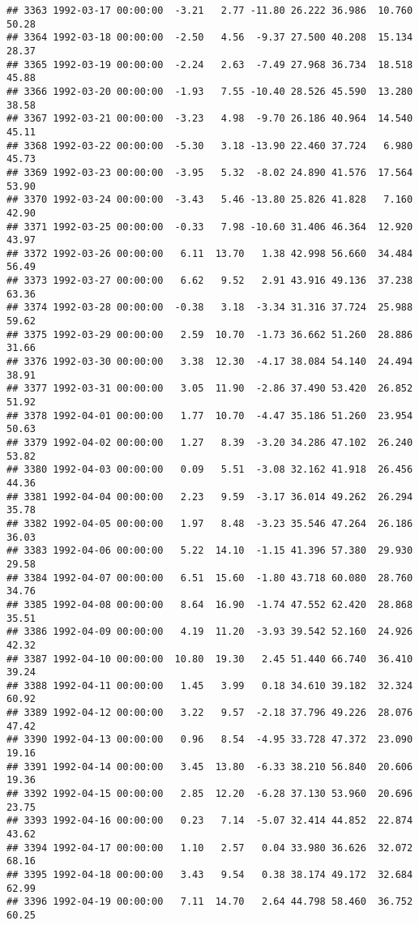 \documentclass{article}\usepackage{graphicx, color}
\makeatletter
\newenvironment{kframe}{%
 \def\at@end@of@kframe{}%
 \ifinner\ifhmode%
  \def\at@end@of@kframe{\end{minipage}}%
  \begin{minipage}{\columnwidth}%
 \fi\fi%
 \def\FrameCommand##1{\hskip\@totalleftmargin \hskip-\fboxsep
 \colorbox{shadecolor}{##1}\hskip-\fboxsep
     \hskip-\linewidth \hskip-\@totalleftmargin \hskip\columnwidth}%
 \MakeFramed {\advance\hsize-\width
   \@totalleftmargin\z@ \linewidth\hsize
   \@setminipage}}%
 {\par\unskip\endMakeFramed%
 \at@end@of@kframe}
\newenvironment{knitrout}{}{} %
\makeatother
\begin{document}
\begin{knitrout}
\begin{kframe}
\begin{verbatim}
## 3363 1992-03-17 00:00:00  -3.21   2.77 -11.80 26.222 36.986  10.760  50.28
## 3364 1992-03-18 00:00:00  -2.50   4.56  -9.37 27.500 40.208  15.134  28.37
## 3365 1992-03-19 00:00:00  -2.24   2.63  -7.49 27.968 36.734  18.518  45.88
## 3366 1992-03-20 00:00:00  -1.93   7.55 -10.40 28.526 45.590  13.280  38.58
## 3367 1992-03-21 00:00:00  -3.23   4.98  -9.70 26.186 40.964  14.540  45.11
## 3368 1992-03-22 00:00:00  -5.30   3.18 -13.90 22.460 37.724   6.980  45.73
## 3369 1992-03-23 00:00:00  -3.95   5.32  -8.02 24.890 41.576  17.564  53.90
## 3370 1992-03-24 00:00:00  -3.43   5.46 -13.80 25.826 41.828   7.160  42.90
## 3371 1992-03-25 00:00:00  -0.33   7.98 -10.60 31.406 46.364  12.920  43.97
## 3372 1992-03-26 00:00:00   6.11  13.70   1.38 42.998 56.660  34.484  56.49
## 3373 1992-03-27 00:00:00   6.62   9.52   2.91 43.916 49.136  37.238  63.36
## 3374 1992-03-28 00:00:00  -0.38   3.18  -3.34 31.316 37.724  25.988  59.62
## 3375 1992-03-29 00:00:00   2.59  10.70  -1.73 36.662 51.260  28.886  31.66
## 3376 1992-03-30 00:00:00   3.38  12.30  -4.17 38.084 54.140  24.494  38.91
## 3377 1992-03-31 00:00:00   3.05  11.90  -2.86 37.490 53.420  26.852  51.92
## 3378 1992-04-01 00:00:00   1.77  10.70  -4.47 35.186 51.260  23.954  50.63
## 3379 1992-04-02 00:00:00   1.27   8.39  -3.20 34.286 47.102  26.240  53.82
## 3380 1992-04-03 00:00:00   0.09   5.51  -3.08 32.162 41.918  26.456  44.36
## 3381 1992-04-04 00:00:00   2.23   9.59  -3.17 36.014 49.262  26.294  35.78
## 3382 1992-04-05 00:00:00   1.97   8.48  -3.23 35.546 47.264  26.186  36.03
## 3383 1992-04-06 00:00:00   5.22  14.10  -1.15 41.396 57.380  29.930  29.58
## 3384 1992-04-07 00:00:00   6.51  15.60  -1.80 43.718 60.080  28.760  34.76
## 3385 1992-04-08 00:00:00   8.64  16.90  -1.74 47.552 62.420  28.868  35.51
## 3386 1992-04-09 00:00:00   4.19  11.20  -3.93 39.542 52.160  24.926  42.32
## 3387 1992-04-10 00:00:00  10.80  19.30   2.45 51.440 66.740  36.410  39.24
## 3388 1992-04-11 00:00:00   1.45   3.99   0.18 34.610 39.182  32.324  60.92
## 3389 1992-04-12 00:00:00   3.22   9.57  -2.18 37.796 49.226  28.076  47.42
## 3390 1992-04-13 00:00:00   0.96   8.54  -4.95 33.728 47.372  23.090  19.16
## 3391 1992-04-14 00:00:00   3.45  13.80  -6.33 38.210 56.840  20.606  19.36
## 3392 1992-04-15 00:00:00   2.85  12.20  -6.28 37.130 53.960  20.696  23.75
## 3393 1992-04-16 00:00:00   0.23   7.14  -5.07 32.414 44.852  22.874  43.62
## 3394 1992-04-17 00:00:00   1.10   2.57   0.04 33.980 36.626  32.072  68.16
## 3395 1992-04-18 00:00:00   3.43   9.54   0.38 38.174 49.172  32.684  62.99
## 3396 1992-04-19 00:00:00   7.11  14.70   2.64 44.798 58.460  36.752  60.25

\end{verbatim}
\end{kframe}
\end{knitrout}
\end{document}
